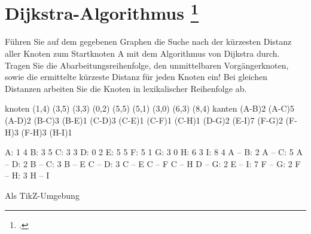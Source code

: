 \documentclass{lehramt-informatik-aufgabe}
\begin{document}

\section{Dijkstra-Algorithmus
\footcite[Aufgabe 4]{aud:e-klausur}
}

Führen Sie auf dem gegebenen Graphen die Suche nach der kürzesten
Distanz aller Knoten zum Startknoten A mit dem Algorithmus von Dijkstra
durch. Tragen Sie die Abarbeitungsreihenfolge, den unmittelbaren
Vorgängerknoten, sowie die ermittelte kürzeste Distanz für jeden Knoten
ein! Bei gleichen Distanzen arbeiten Sie die Knoten in lexikalischer
Reihenfolge ab.

\graph knoten {
  (1,4)
  (3,5)
  (3,3)
  (0,2)
  (5,5)
  (5,1)
  (3,0)
  (6,3)
  (8,4)
} kanten {
  \kante(A-B){2}
  \kante(A-C){5}
  \kante(A-D){2}
  \kante(B-C){3}
  \kante(B-E){1}
  \kante(C-D){3}
  \kante(C-E){1}
  \kante(C-F){1}
  \kante(C-H){1}
  \kante(D-G){2}
  \kante(E-I){7}
  \kante(F-G){2}
  \kante(F-H){3}
  \kante(F-H){3}
  \kante(H-I){1}
}

\begin{liEinfachesGraphenFormat}
A: 1 4
B: 3 5
C: 3 3
D: 0 2
E: 5 5
F: 5 1
G: 3 0
H: 6 3
I: 8 4
A -- B: 2
A -- C: 5
A -- D: 2
B -- C: 3
B -- E
C -- D: 3
C -- E
C -- F
C -- H
D -- G: 2
E -- I: 7
F -- G: 2
F -- H: 3
H -- I
\end{liEinfachesGraphenFormat}

Als TikZ-Umgebung

\end{document}
